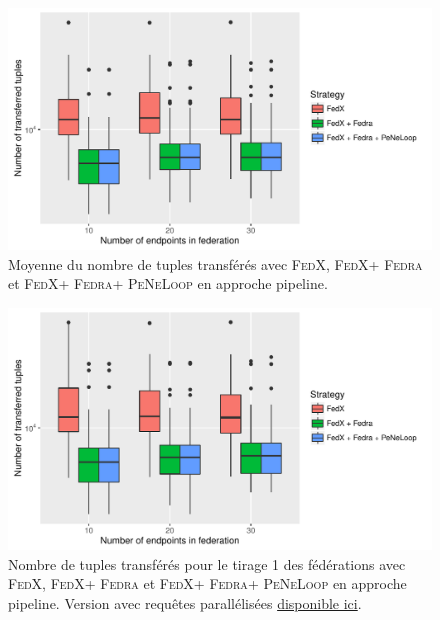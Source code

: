 \documentclass[a4paper]{article}
\def\fedra{\textsc{Fedra}\xspace}
\def\fedx{\textsc{FedX}\xspace}
\def\peneloop{\textsc{PeNeLoop}\xspace}
\newcommand{\parallelLink}[1]{Version avec requêtes parallélisées \href{#1}{disponible ici}.}
\begin{document}
\begin{figure}[h]
    \centering
    \includegraphics{boxplots/avg_transferred_tuples.pdf}
    \caption{Moyenne du nombre de tuples transférés avec \fedx, \fedx + \fedra et \fedx + \fedra + \peneloop en approche pipeline.}
    \label{fig:avg_tuples}
\end{figure}

\begin{figure}[h]
    \centering
    \includegraphics{boxplots/fed1_transferred_tuples.pdf}
    \caption{Nombre de tuples transférés pour le tirage 1 des fédérations avec \fedx, \fedx + \fedra et \fedx + \fedra + \peneloop en approche pipeline. \parallelLink{https://github.com/Callidon/ParallelNestedLoop/blob/master/results/definitive/fed1_pll_transferred_tuples.pdf}}
    \label{fig:fed1_tuples}
\end{figure}
\end{document}
